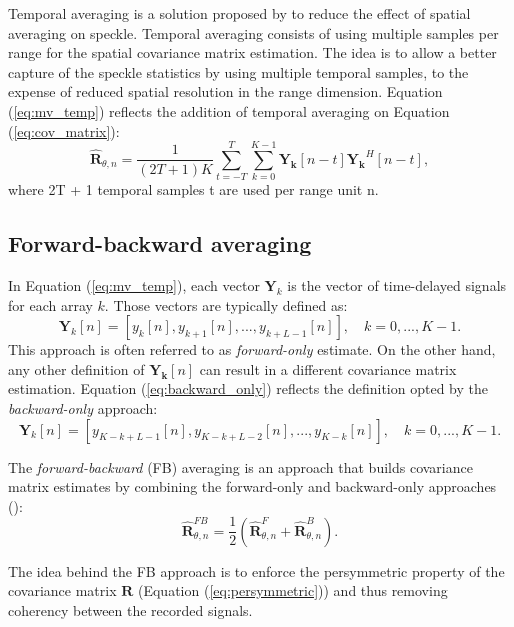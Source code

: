 Temporal averaging is a solution proposed by \cite{speckle} to reduce the effect of spatial averaging on speckle. Temporal averaging consists of using multiple samples per range for the spatial covariance matrix estimation. The idea is to allow a better capture of the speckle statistics by using multiple temporal samples, to the expense of reduced spatial resolution in the range dimension. Equation (\ref{eq:mv_temp}) reflects the addition of temporal averaging on Equation (\ref{eq:cov_matrix}):
\begin{equation}
    \boldsymbol{\hat{R}}_{\theta, n} = \frac{1}{(2T + 1) K} \sum_{t=-T}^{T} \sum_{k=0}^{K-1} \boldsymbol{Y_k}[n - t] \boldsymbol{Y_k}^H[n - t],
\label{eq:mv_temp}
\end{equation}
\noindent
where 2T + 1 temporal samples t are used per range unit n.


\subsection{Forward-backward averaging}
\label{sec:fb_averaging}
In Equation (\ref{eq:mv_temp}), each vector $\boldsymbol{Y}_k$ is the vector of time-delayed signals for each array $k$. Those vectors are typically defined as:
\begin{equation}
    \boldsymbol{Y}_k[n] = [y_k[n], y_{k+1}[n],...,y_{k+L-1}[n]], \quad k = 0,...,K-1.
\label{eq:forward_only}
\end{equation}
\noindent
This approach is often referred to as \textit{forward-only} estimate.
On the other hand, any other definition of $\boldsymbol{Y_k}[n]$ can result in a different covariance matrix estimation. Equation (\ref{eq:backward_only}) reflects the definition opted by the \textit{backward-only} approach:
\begin{equation}
    \boldsymbol{Y}_k[n] = [y_{K-k+L-1}[n], y_{K-k+L-2}[n],...,y_{K-k}[n]], \quad k = 0,...,K-1.
\label{eq:backward_only}
\end{equation}
\noindent

The \textit{forward-backward} (FB) averaging is an approach that builds covariance matrix estimates by combining the forward-only and backward-only approaches (\cite{van_trees}):
\begin{equation}
    \boldsymbol{\hat{R}}_{\theta,n}^{FB} = \frac{1}{2} (\boldsymbol{\hat{R}}_{\theta,n}^F + \boldsymbol{\hat{R}}_{\theta,n}^B).
\label{eq:fb_averaging}
\end{equation}

The idea behind the FB approach is to enforce the persymmetric property of the covariance matrix $\boldsymbol{R}$ (Equation (\ref{eq:persymmetric})) and thus removing coherency between the recorded signals.


